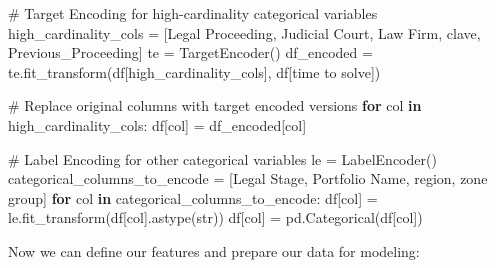\documentclass[
  letterpaper,
  DIV=11,
  numbers=noendperiod]{scrartcl}
\newenvironment{Shaded}{\begin{snugshade}}{\end{snugshade}}
\newcommand{\BuiltInTok}[1]{\textcolor[rgb]{0.00,0.23,0.31}{#1}}
\newcommand{\CommentTok}[1]{\textcolor[rgb]{0.37,0.37,0.37}{#1}}
\newcommand{\ControlFlowTok}[1]{\textcolor[rgb]{0.00,0.23,0.31}{\textbf{#1}}}
\newcommand{\KeywordTok}[1]{\textcolor[rgb]{0.00,0.23,0.31}{\textbf{#1}}}
\newcommand{\NormalTok}[1]{\textcolor[rgb]{0.00,0.23,0.31}{#1}}
\newcommand{\OperatorTok}[1]{\textcolor[rgb]{0.37,0.37,0.37}{#1}}
\newcommand{\StringTok}[1]{\textcolor[rgb]{0.13,0.47,0.30}{#1}}
\begin{document}
\begin{Shaded}
\begin{Highlighting}[]
\CommentTok{\# Target Encoding for high{-}cardinality categorical variables}
\NormalTok{high\_cardinality\_cols }\OperatorTok{=}\NormalTok{ [}\StringTok{\textquotesingle{}Legal Proceeding\textquotesingle{}}\NormalTok{, }\StringTok{\textquotesingle{}Judicial Court\textquotesingle{}}\NormalTok{, }\StringTok{\textquotesingle{}Law Firm\textquotesingle{}}\NormalTok{, }\StringTok{\textquotesingle{}clave\textquotesingle{}}\NormalTok{, }\StringTok{\textquotesingle{}Previous\_Proceeding\textquotesingle{}}\NormalTok{]}
\NormalTok{te }\OperatorTok{=}\NormalTok{ TargetEncoder()}
\NormalTok{df\_encoded }\OperatorTok{=}\NormalTok{ te.fit\_transform(df[high\_cardinality\_cols], df[}\StringTok{\textquotesingle{}time to solve\textquotesingle{}}\NormalTok{])}

\CommentTok{\# Replace original columns with target encoded versions}
\ControlFlowTok{for}\NormalTok{ col }\KeywordTok{in}\NormalTok{ high\_cardinality\_cols:}
\NormalTok{    df[col] }\OperatorTok{=}\NormalTok{ df\_encoded[col]}

\CommentTok{\# Label Encoding for other categorical variables}
\NormalTok{le }\OperatorTok{=}\NormalTok{ LabelEncoder()}
\NormalTok{categorical\_columns\_to\_encode }\OperatorTok{=}\NormalTok{ [}\StringTok{\textquotesingle{}Legal Stage\textquotesingle{}}\NormalTok{, }\StringTok{\textquotesingle{}Portfolio Name\textquotesingle{}}\NormalTok{, }\StringTok{\textquotesingle{}region\textquotesingle{}}\NormalTok{, }\StringTok{\textquotesingle{}zone group\textquotesingle{}}\NormalTok{]}
\ControlFlowTok{for}\NormalTok{ col }\KeywordTok{in}\NormalTok{ categorical\_columns\_to\_encode:}
\NormalTok{    df[col] }\OperatorTok{=}\NormalTok{ le.fit\_transform(df[col].astype(}\BuiltInTok{str}\NormalTok{))}
\NormalTok{    df[col] }\OperatorTok{=}\NormalTok{ pd.Categorical(df[col])}
\end{Highlighting}
\end{Shaded}

Now we can define our features and prepare our data for modeling:
\end{document}
